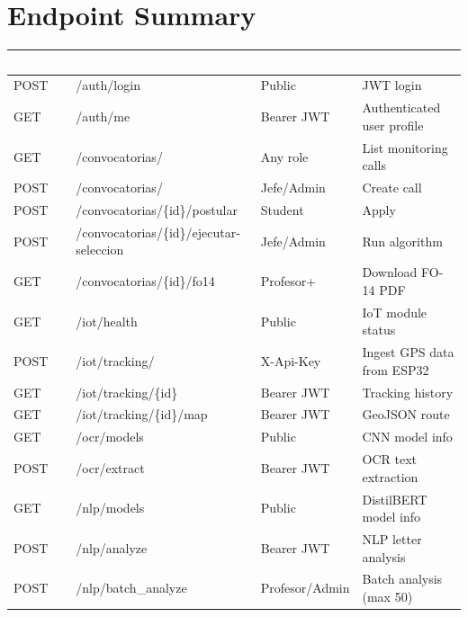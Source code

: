 \documentclass[12pt,a4paper,twoside]{report}
\begin{document}
\section{Endpoint Summary}
\begin{center}
\begin{tabularx}{\textwidth}{|l|p{5.5cm}|p{2.8cm}|X|}
\hline
\rowcolor{tableHdr}
\textcolor{white}{\textbf{Method}} & \textcolor{white}{\textbf{Endpoint}} &
\textcolor{white}{\textbf{Auth}} & \textcolor{white}{\textbf{Description}} \\
\hline
\rowcolor{rowOdd}POST & /auth/login & Public & JWT login \\
\hline\rowcolor{rowEven}GET & /auth/me & Bearer JWT & Authenticated user profile \\
\hline\rowcolor{rowOdd}GET & /convocatorias/ & Any role & List monitoring calls \\
\hline\rowcolor{rowEven}POST & /convocatorias/ & Jefe/Admin & Create call \\
\hline\rowcolor{rowOdd}POST & /convocatorias/\{id\}/postular & Student & Apply \\
\hline\rowcolor{rowEven}POST & /convocatorias/\{id\}/ejecutar-seleccion & Jefe/Admin & Run algorithm \\
\hline\rowcolor{rowOdd}GET & /convocatorias/\{id\}/fo14 & Profesor+ & Download FO-14 PDF \\
\hline\rowcolor{rowEven}GET & /iot/health & Public & IoT module status \\
\hline\rowcolor{rowOdd}POST & /iot/tracking/ & X-Api-Key & Ingest GPS data from ESP32 \\
\hline\rowcolor{rowEven}GET & /iot/tracking/\{id\} & Bearer JWT & Tracking history \\
\hline\rowcolor{rowOdd}GET & /iot/tracking/\{id\}/map & Bearer JWT & GeoJSON route \\
\hline\rowcolor{rowEven}GET & /ocr/models & Public & CNN model info \\
\hline\rowcolor{rowOdd}POST & /ocr/extract & Bearer JWT & OCR text extraction \\
\hline\rowcolor{rowEven}GET & /nlp/models & Public & DistilBERT model info \\
\hline\rowcolor{rowOdd}POST & /nlp/analyze & Bearer JWT & NLP letter analysis \\
\hline\rowcolor{rowEven}POST & /nlp/batch\_analyze & Profesor/Admin & Batch analysis (max 50) \\
\hline
\end{tabularx}
\end{center}
\end{document}
